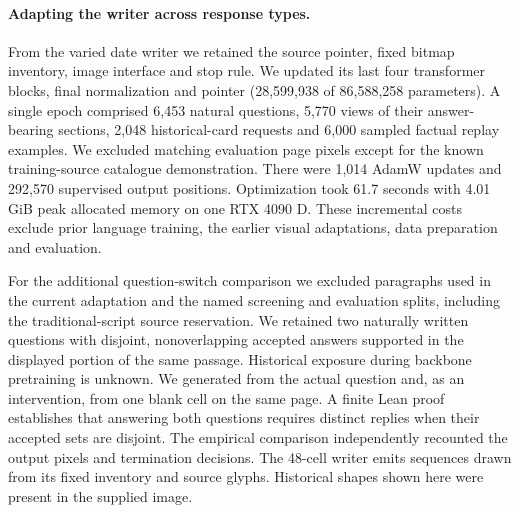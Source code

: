 \paragraph{Adapting the writer across response types.}
From the varied date writer we retained the source pointer, fixed bitmap inventory, image interface and stop rule. We updated its last four transformer blocks, final normalization and pointer (28,599,938 of 86,588,258 parameters). A single epoch comprised 6,453 natural questions, 5,770 views of their answer-bearing sections, 2,048 historical-card requests and 6,000 sampled factual replay examples. We excluded matching evaluation page pixels except for the known training-source catalogue demonstration. There were 1,014 AdamW updates and 292,570 supervised output positions. Optimization took 61.7 seconds with 4.01 GiB peak allocated memory on one RTX 4090 D. These incremental costs exclude prior language training, the earlier visual adaptations, data preparation and evaluation.

For the additional question-switch comparison we excluded paragraphs used in the current adaptation and the named screening and evaluation splits, including the traditional-script source reservation. We retained two naturally written questions with disjoint, nonoverlapping accepted answers supported in the displayed portion of the same passage. Historical exposure during backbone pretraining is unknown. We generated from the actual question and, as an intervention, from one blank cell on the same page. A finite Lean proof establishes that answering both questions requires distinct replies when their accepted sets are disjoint. The empirical comparison independently recounted the output pixels and termination decisions. The 48-cell writer emits sequences drawn from its fixed inventory and source glyphs. Historical shapes shown here were present in the supplied image.
